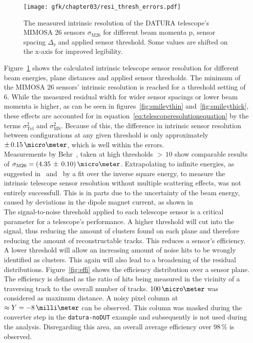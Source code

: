 \begin{figure}[hbtp]
\centering

\texttt{[image: gfk/chapter03/resi\_thresh\_errors.pdf]}
\caption[Telescope intrinsic sensor resolution for different threshold settings,
beam momenta and geometries]{The measured intrinsic resolution of the DATURA
telescope's MIMOSA 26 sensors $\sigma_{\textrm{M26}}$ for different beam momenta
p, sensor spacing $\Delta_{\textrm{z}}$ and applied sensor threshold. Some
values are shifted on the x-axis for improved legibility.}
\label{fig:resivsenergy}
\end{figure}

Figure~\ref{fig:resivsenergy} shows the calculated intrinsic telescope sensor
resolution for different beam energies, plane distances and applied sensor
thresholds. The minimum of the MIMOSA 26 sensors' intrinsic resolution is
reached for a threshold setting of $6$. While the measured residual width for
wider sensor spacings or lower beam momenta is higher, as can be seen in
figures~\ref{fig:smileythin} and~\ref{fig:smileythick}, these effects are
accounted for in equation~\ref{eq:telescoperesolutionequation} by the terms
$\sigma_{\textrm{Tel}}^2$ and $\sigma_{\textrm{MS}}^2$. Because of this, the
difference in intrinsic sensor resolution between configurations at any given
threshold is only approximately $\pm\,0.15\,\micro\meter$, which is well within
the errors.\\


Measurements by Behr~\cite{ref:j.behrmeasurements}, taken at high thresholds
$>\,10$ show comparable results of $\sigma_{\textrm{M26}} =
(4.35\,\pm\,0.10)\,\micro\meter$. Extrapolating to infinite energies, as
suggested in~\cite{ref:cmosbeamtest} and~\cite{ref:moritzthesis} by a fit over
the inverse square energy, to measure the intrinsic telescope sensor resolution
without multiple scattering effects, was not entirely successfull. This is in
parts due to the uncertainty of the beam energy, caused by deviations in the
dipole magnet current, as shown in~\cite{ref:summerstudentbrm}\\

The signal-to-noise threshold applied to each telescope sensor is a critical
parameter for a telescope's performance. A higher threshold will cut into the
signal, thus reducing the amount of clusters found on each plane and therefore
reducing the amount of reconstructable tracks. This reduces a sensor's
efficiency. A lower threshold will allow an increasing amount of noise hits to
be wrongly identified as clusters. This again will also lead to a broadening of
the residual distributions. Figure~\ref{fig:effi} shows the efficiency
distribution over a sensor plane. The efficiency is defined as the ratio of hits
being measured in the vicinity of a traversing track to the overall number of
tracks. $100\,\micro\meter$ was considered as maximum distance. A noisy pixel
column at $\approx Y = -8\,\milli\meter$ can be observed. This column was masked
during the converter step in the \texttt{datura-noDUT} example and subsequently
is not used during the analysis. Disregarding this area, an overall average
efficiency over $98\,\%$ is observed.\\

